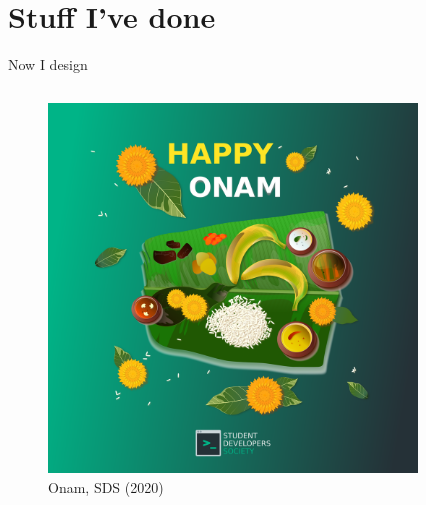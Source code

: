 \documentclass[presentation]{beamer}
\begin{document}
\section*{Stuff I've done}
\label{sec:org5f53e91}
\begin{frame}[label={sec:org54778ac}]{Now I design}
\begin{columns}
\begin{column}{0.25\columnwidth}
\begin{figure}[htbp]
\centering
\includegraphics[width=.9\linewidth]{./images/onam4.png}
\caption{Onam, SDS (2020)}
\end{figure}
\end{column}
\begin{column}{0.25\columnwidth}
\begin{figure}[htbp]
\centering

\end{figure}
\end{column}
\end{columns}
\end{frame}
\end{document}
